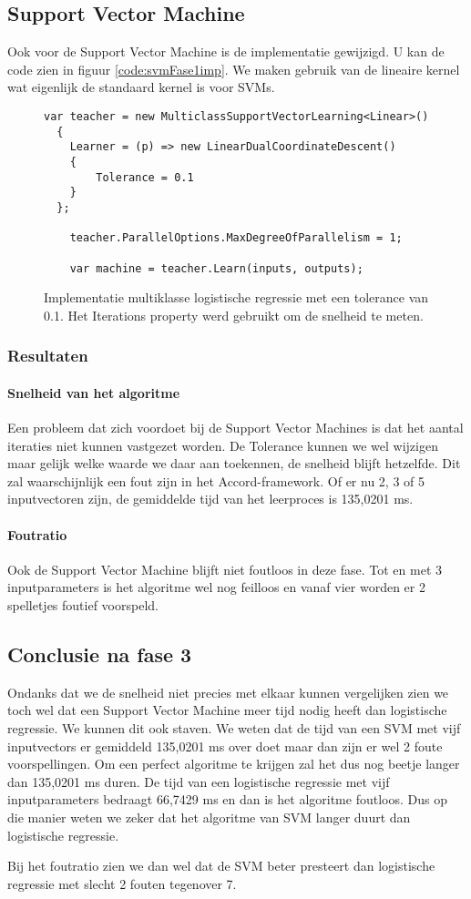 \newpage
\subsection{Support Vector Machine}
\label{sec:supportvectormachineFase3}
Ook voor de Support Vector Machine is de implementatie gewijzigd. U kan de code zien in figuur \ref{code:svmFase1imp}. We maken gebruik van de lineaire kernel wat eigenlijk de standaard kernel is voor SVMs.
\begin{figure}[]
	\renewcommand{\figurename}{Code}
	\begin{lstlisting}
var teacher = new MulticlassSupportVectorLearning<Linear>()
  {
    Learner = (p) => new LinearDualCoordinateDescent()
    {
        Tolerance = 0.1
    }
  };

    teacher.ParallelOptions.MaxDegreeOfParallelism = 1;

    var machine = teacher.Learn(inputs, outputs);
	\end{lstlisting}
	\caption{Implementatie multiklasse logistische regressie met een tolerance van 0.1. Het Iterations property werd gebruikt om de snelheid te meten.}
	\label{code:svmFase3imp}
\end{figure}


\subsubsection{Resultaten}
\paragraph{Snelheid van het algoritme} 
Een probleem dat zich voordoet bij de Support Vector Machines is dat het aantal iteraties niet kunnen vastgezet worden. De Tolerance kunnen we wel wijzigen maar gelijk welke waarde we daar aan toekennen, de snelheid blijft hetzelfde. Dit zal waarschijnlijk een fout zijn in het Accord-framework. Of er nu 2, 3 of 5 inputvectoren zijn, de gemiddelde tijd van het leerproces is 135,0201 ms.


\paragraph{Foutratio}
Ook de Support Vector Machine blijft niet foutloos in deze fase. Tot en met 3 inputparameters is het algoritme wel nog feilloos en vanaf vier worden er 2 spelletjes foutief voorspeld.  

\subsection{Conclusie na fase 3}
Ondanks dat we de snelheid niet precies met elkaar kunnen vergelijken zien we toch wel dat een Support Vector Machine meer tijd nodig heeft dan logistische regressie. We kunnen dit ook staven. We weten dat de tijd van een SVM met vijf inputvectors er gemiddeld 135,0201 ms over doet maar dan zijn er wel 2 foute voorspellingen. Om een perfect algoritme te krijgen zal het dus nog beetje langer dan 135,0201 ms duren. De tijd van een logistische regressie met vijf inputparameters bedraagt 66,7429 ms en dan is het algoritme foutloos. Dus op die manier weten we zeker dat het algoritme van SVM langer duurt dan logistische regressie. 

Bij het foutratio zien we dan wel dat de SVM beter presteert dan logistische regressie met slecht 2 fouten tegenover 7. 

 